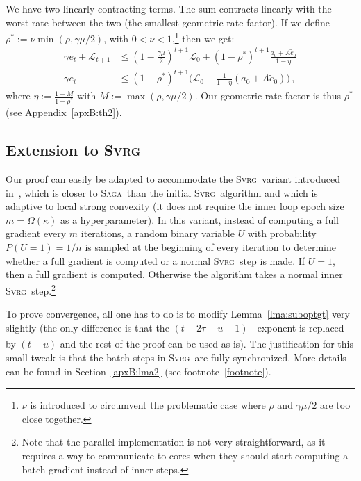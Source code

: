 \documentclass[twoside]{article}
\newcommand{\stepsize}{\gamma}
\newcommand{\strongconvex}{\mu}
\newcommand{\overlap}{\tau}
\newcommand{\contraction}{\rho}
\newcommand{\lyapunov}{\mathcal{L}}
\newcommand{\SAGA}{\textsc{Saga}}
\newcommand{\SVRG}{\textsc{Svrg}}
\begin{document}
We have two linearly contracting terms. 
The sum contracts linearly with the worst rate between the two (the smallest geometric rate factor).
If we define $\contraction^* := \nu \min(\contraction, \stepsize \strongconvex / 2)$, with $0 <\nu < 1$,\footnote{$\nu$ is introduced to circumvent the problematic case where $\contraction$ and  $\stepsize \strongconvex / 2$ are too close together.} then we get:
\begin{align}
\stepsize e_t + \lyapunov_{t+1} 
&\leq (1-\frac{\stepsize\strongconvex}{2})^{t+1}\lyapunov_0 + (1 - \contraction^*)^{t+1} \frac{a_0 + A \tilde e_0}{1 -\eta} 
\\
\stepsize e_t &\leq (1 - \contraction^*)^{t+1} \big(\lyapunov_0 + \frac{1}{1 -\eta} (a_0 + A  \tilde e_0) \big) \, ,
\end{align}
where $\eta := \frac{1-M}{1-\contraction^*}$ with $M :=\max(\contraction, \stepsize\strongconvex/2)$. Our geometric rate factor is thus $\contraction^*$ (see Appendix~\ref{apxB:th2}).

\subsection{Extension to \SVRG}\label{apx:SVRGext}
Our proof can easily be adapted to accommodate the \SVRG\ variant introduced in~\citet{qsaga}, which is closer to \SAGA\ than the initial \SVRG\ algorithm and which is adaptive to local strong convexity (it does not require the inner loop epoch size~$m = \Omega(\kappa)$ as a hyperparameter). 
In this variant, instead of computing a full gradient every $m$ iterations, a random binary variable $U$ with probability $P(U=1)=1/n$ is sampled at the beginning of every iteration to determine whether a full gradient is computed or a normal \SVRG\ step is made. 
If $U=1$, then a full gradient is computed.
Otherwise the algorithm takes a normal inner \SVRG\ step.\footnote{Note that the parallel implementation is not very straightforward, as it requires a way to communicate to cores when they should start computing a batch gradient instead of inner steps.}

To prove convergence, all one has to do is to modify Lemma~\ref{lma:suboptgt} very slightly (the only difference is that the $(t -2\overlap -u -1)_+$ exponent is replaced by $(t - u)$ and the rest of the proof can be used as is).
The justification for this small tweak is that the batch steps in \SVRG\ are fully synchronized. More details can be found in Section~\ref{apxB:lma2} (see footnote~\ref{footnote}).
\end{document}
